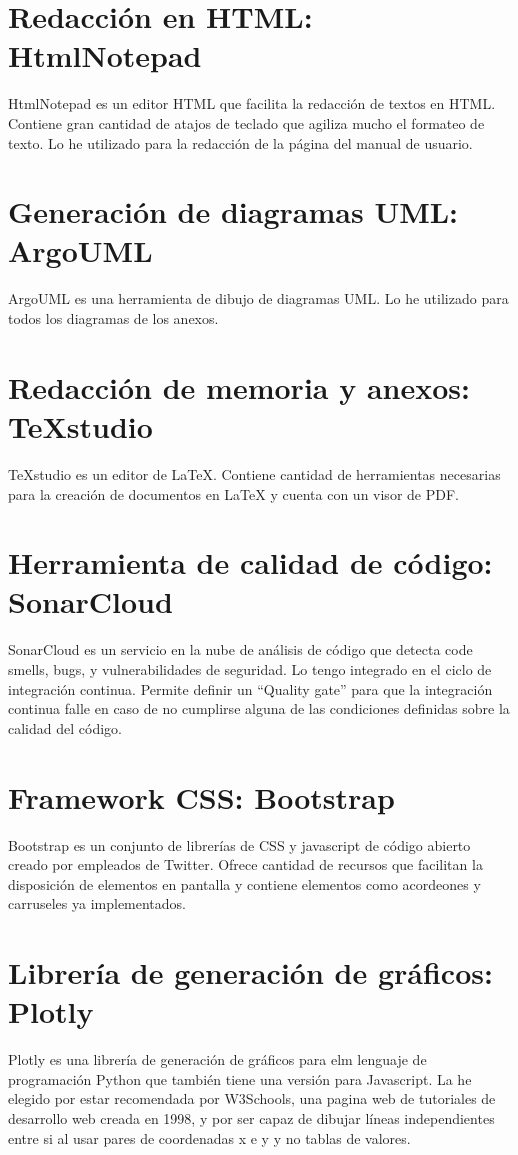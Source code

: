 \section{Redacción en HTML: HtmlNotepad}
HtmlNotepad es un editor HTML que facilita la redacción de textos en HTML. Contiene gran cantidad de atajos de teclado que agiliza mucho el formateo de texto. Lo he utilizado para la redacción de la página del manual de usuario.
\section{Generación de diagramas UML: ArgoUML}
ArgoUML es una herramienta de dibujo de diagramas UML. Lo he utilizado para todos los diagramas de los anexos. 
\section{Redacción de memoria y anexos: TeXstudio}
TeXstudio es un editor de LaTeX. Contiene cantidad de herramientas necesarias para la creación de documentos en LaTeX y cuenta con un visor de PDF.
\section{Herramienta de calidad de código: SonarCloud}
SonarCloud es un servicio en la nube de análisis de código que detecta code smells, bugs, y vulnerabilidades de seguridad. Lo tengo integrado en el ciclo de integración continua. Permite definir un ``Quality gate'' para que la integración continua falle en caso de no cumplirse alguna de las condiciones definidas sobre la calidad del código.
\section{Framework CSS: Bootstrap}
Bootstrap es un conjunto de librerías de CSS y javascript de código abierto creado por empleados de Twitter. Ofrece cantidad de recursos que facilitan la disposición de elementos en pantalla y contiene elementos como acordeones y carruseles ya implementados.
\section{Librería de generación de gráficos: Plotly}
Plotly es una librería de generación de gráficos para elm lenguaje de programación Python que también tiene una versión para Javascript. La he elegido por estar recomendada por W3Schools, una pagina web de tutoriales de desarrollo web creada en 1998, y por ser capaz de dibujar líneas independientes entre si al usar pares de coordenadas x e y y no tablas de valores.


